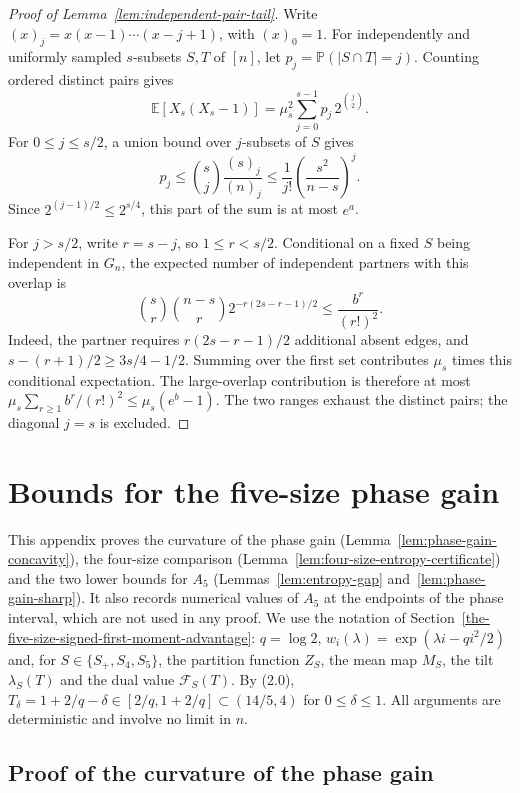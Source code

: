 \documentclass[a4paper,10pt,reqno]{amsart}
\numberwithin{equation}{section}
\theoremstyle{plain}
\theoremstyle{remark}
\begin{document}
\begin{proof}[Proof of Lemma~\ref{lem:independent-pair-tail}]
Write \((x)_j=x(x-1)\cdots(x-j+1)\), with \((x)_0=1\).
For independently and uniformly sampled \(s\)-subsets \(S,T\) of \([n]\), let
\(p_j=\mathbb P(|S\cap T|=j)\). Counting ordered distinct pairs gives
\[
 \mathbb E[X_s(X_s-1)]
 =\mu_s^2\sum_{j=0}^{s-1}p_j\,2^{\binom j2}.
\]
For \(0\le j\le s/2\), a union bound over \(j\)-subsets of \(S\) gives
\[
 p_j\le\binom sj\frac{(s)_j}{(n)_j}
 \le\frac1{j!}\left(\frac{s^2}{n-s}\right)^j.
\]
Since \(2^{(j-1)/2}\le2^{s/4}\), this part of the sum is at most \(e^a\).

For \(j>s/2\), write \(r=s-j\), so \(1\le r<s/2\).
Conditional on a fixed \(S\) being independent in \(G_n\), the expected
number of independent partners with this overlap is
\[
 \binom sr\binom{n-s}{r}
 2^{-r(2s-r-1)/2}
 \le\frac{b^r}{(r!)^2}.
\]
Indeed, the partner requires \(r(2s-r-1)/2\) additional absent edges, and
\(s-(r+1)/2\ge3s/4-1/2\). Summing over the first set contributes \(\mu_s\)
times this conditional expectation. The large-overlap contribution is
therefore at most
\(\mu_s\sum_{r\ge1}b^r/(r!)^2\le\mu_s(e^b-1)\).
The two ranges exhaust the distinct pairs; the diagonal \(j=s\) is excluded.
\end{proof}

\section{Bounds for the five-size phase gain}
\label{app:phase-gain}

This appendix proves the curvature of the phase gain
(Lemma~\ref{lem:phase-gain-concavity}), the four-size comparison
(Lemma~\ref{lem:four-size-entropy-certificate}) and the two lower bounds for
$A_5$ (Lemmas~\ref{lem:entropy-gap} and~\ref{lem:phase-gain-sharp}). It also
records numerical values of $A_5$ at the endpoints of the phase interval,
which are not used in any proof. We use the notation of
Section~\ref{the-five-size-signed-first-moment-advantage}: $q=\log 2$,
$w_i(\lambda)=\exp(\lambda i-qi^2/2)$ and, for $S\in\{S_+,S_4,S_5\}$, the
partition function $Z_S$, the mean map $M_S$, the tilt $\lambda_S(T)$ and the
dual value $\mathcal F_S(T)$. By (2.0),
$T_\delta=1+2/q-\delta\in[2/q,1+2/q]\subset(14/5,4)$ for $0\le\delta\le1$.
All arguments are deterministic and involve no limit in $n$.

\subsection{Proof of the curvature of the phase gain}
\label{app:phase-gain-concavity}
\end{document}
